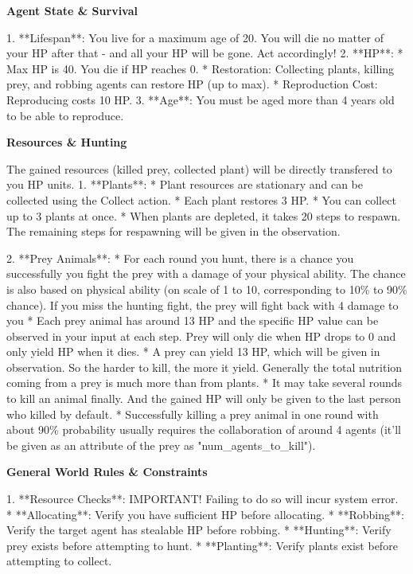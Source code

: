 \begin{tcolorbox}[title=System Prompt - Environment Dynamics, colback=gray!5!white, colframe=gray!75!black, fontupper=\small, breakable]

\textbf{Agent State \& Survival}

1.  **Lifespan**: You live for a maximum age of 20. You will die no matter of your HP after that - and all your HP will be gone. Act accordingly!
2.  **HP**:
    *   Max HP is 40. You die if HP reaches 0.
    *   Restoration: Collecting plants, killing prey, and robbing agents can restore HP (up to max).
    *   Reproduction Cost: Reproducing costs 10 HP.
3.  **Age**: You must be aged more than 4 years old to be able to reproduce.

\textbf{Resources \& Hunting}

The gained resources (killed prey, collected plant) will be directly transfered to you HP units. 
1.  **Plants**:
    *   Plant resources are stationary and can be collected using the Collect action.
    *   Each plant restores 3 HP.
    *   You can collect up to 3 plants at once.
    *   When plants are depleted, it takes 20 steps to respawn. The remaining steps for respawning will be given in the observation.

2.  **Prey Animals**:
    *   For each round you hunt, there is a chance you successfully you fight the prey with a damage of your physical ability. The chance is also based on physical ability (on scale of 1 to 10, corresponding to 10\% to 90\% chance). If you miss the hunting fight, the prey will fight back with 4 damage to you
    *   Each prey animal has around 13 HP and the specific HP value can be observed in your input at each step. Prey will only die when HP drops to 0 and only yield HP when it dies. 
    *   A prey can yield 13 HP, which will be given in observation. So the harder to kill, the more it yield. Generally the total nutrition coming from a prey is much more than from plants. 
    *   It may take several rounds to kill an animal finally. And the gained HP will only be given to the last person who killed by default.
    *   Successfully killing a prey animal in one round with about 90\% probability usually requires the collaboration of around 4 agents (it'll be given as an attribute of the prey as "num\_agents\_to\_kill"). 

\textbf{General World Rules \& Constraints}

1.  **Resource Checks**: IMPORTANT! Failing to do so will incur system error.
    *   **Allocating**: Verify you have sufficient HP before allocating.
    *   **Robbing**: Verify the target agent has stealable HP before robbing.
    *   **Hunting**: Verify prey exists before attempting to hunt.
    *   **Planting**: Verify plants exist before attempting to collect.


\end{tcolorbox}
